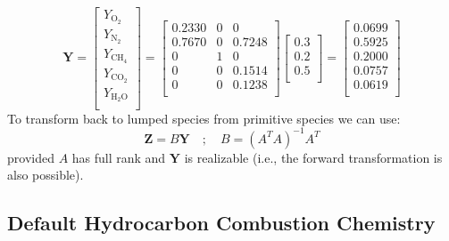 \begin{equation}\label{eq:transform_to_primitive}
\mathbf{Y}=\left[\begin{array}{c}
       Y_{\mathrm{O}_2} \\
       Y_{\mathrm{N}_2} \\
       Y_{\mathrm{CH}_4} \\
       Y_{\mathrm{CO}_2} \\
       Y_{\mathrm{H}_2\mathrm{O}} \\
     \end{array}\right]
     =\left[\begin{array}{ccc}
     0.2330 & 0 & 0 \\
     0.7670 & 0 & 0.7248 \\
     0 & 1 & 0 \\
     0 & 0 & 0.1514 \\
     0 & 0 & 0.1238 \\
     \end{array}\right]
     \left[\begin{array}{c}
     0.3 \\
     0.2 \\
     0.5 \\
     \end{array}\right]
     =\left[\begin{array}{c}
     0.0699\\
     0.5925\\
     0.2000\\
     0.0757\\
     0.0619\\
     \end{array}\right]
\end{equation}
To transform back to lumped species from primitive species we can use:
\begin{equation}\label{eq:transform_back}
\textbf{Z}=B\textbf{Y} \quad ; \quad B=(A^TA)^{-1}A^T
\end{equation}
provided $A$ has full rank and $\mathbf{Y}$ is realizable (i.e., the forward transformation is also possible).

\subsection{Default Hydrocarbon Combustion Chemistry}
\label{sec:simplechemistry}

